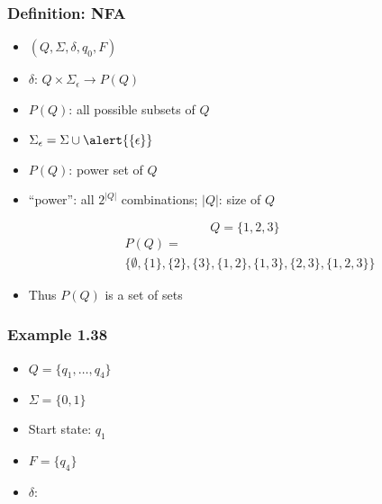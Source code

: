\begin{frame}[allowframebreaks] \frametitle{Definition: NFA}
  \begin{itemize}
\item $(Q, \Sigma, \delta, q_0, F)$
\item $\delta$: $Q \times \Sigma_\epsilon \rightarrow
P(Q)$

\item [] $P(Q)$: all possible subsets of $Q$
\item $\Sigma_\epsilon
=\Sigma \cup \alert{\{\epsilon\}}$
\item $P(Q)$: power set of $Q$

\item [] ``power'': all $2^{|Q|}$ combinations; $|Q|$: size of $Q$ 

\begin{equation*}
  Q = \{1,2,3\}
\end{equation*}
\begin{equation*}
  \begin{split}
&  P(Q)= \\
&  \{\emptyset,
\{1\}, \{2\},
\{3\},
\{1,2\},
\{1,3\},
\{2,3\},
\{1,2,3\}\}
\end{split}
\end{equation*}
\item Thus $P(Q)$ is a set of sets
\end{itemize}\end{frame} \begin{frame}[allowframebreaks] \frametitle{Example 1.38}
  \begin{center}
\end{center}

  \begin{itemize}
\item $Q=\{q_1,\ldots, q_4\}$
\item $\Sigma = \{0,1\}$
\item Start state: $q_1$
\item $F=\{q_4\}$
\item $\delta$:


\end{itemize}
\end{frame}
